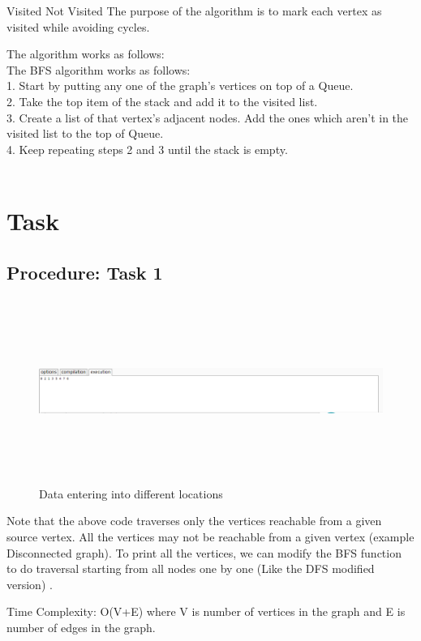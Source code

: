 \documentclass[12pt]{article}            %
\begin{document}
Visited
Not Visited
The purpose of the algorithm is to mark each vertex as visited while avoiding cycles.

The algorithm works as follows: \\
The BFS algorithm works as follows:\\
1.	Start by putting any one of the graph's vertices on top of a Queue.\\
2.	Take the top item of the stack and add it to the visited list.\\
3.	Create a list of that vertex's adjacent nodes. Add the ones which aren't in the visited list to the top of Queue. \\
4.	Keep repeating steps 2 and 3 until the stack is empty.\\ \\

\section{Task}  
\subsection{Procedure: Task 1 }     

\begin{figure}
\centering
  \includegraphics[width=12cm,height=6cm,keepaspectratio]{3.png}
\caption{Data entering into different locations}
\label{Figure:3}    
\end{figure}
Note that the above code traverses only the vertices reachable from a given source vertex. All the vertices may not be reachable from a given vertex (example Disconnected graph). To print all the vertices, we can modify the BFS function to do traversal starting from all nodes one by one (Like the DFS modified version) .

Time Complexity: O(V+E) where V is number of vertices in the graph and E is number of edges in the graph.
\end{document}
